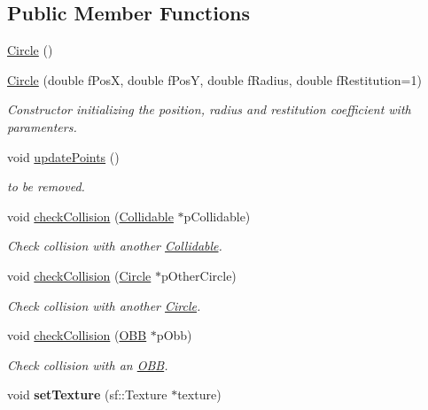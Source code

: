 \subsection*{Public Member Functions}
\begin{DoxyCompactItemize}
\item 
\hyperlink{class_circle_ad1ecfcfc7bf34529c6a6d6c448bf70fe}{Circle} ()
\item 
\hyperlink{class_circle_a70b2953314268546bc4f784c3e82df1b}{Circle} (double f\+Pos\+X, double f\+Pos\+Y, double f\+Radius, double f\+Restitution=1)
\begin{DoxyCompactList}\small\item\em Constructor initializing the position, radius and restitution coefficient with paramenters. \end{DoxyCompactList}\item 
\hypertarget{class_circle_afe23c30a1bbc5e831b72063aef91b38f}{}void \hyperlink{class_circle_afe23c30a1bbc5e831b72063aef91b38f}{update\+Points} ()\label{class_circle_afe23c30a1bbc5e831b72063aef91b38f}

\begin{DoxyCompactList}\small\item\em to be removed. \end{DoxyCompactList}\item 
void \hyperlink{class_circle_ad74b27696652e85e97503aef986f32b5}{check\+Collision} (\hyperlink{class_collidable}{Collidable} $\ast$p\+Collidable)
\begin{DoxyCompactList}\small\item\em Check collision with another \hyperlink{class_collidable}{Collidable}. \end{DoxyCompactList}\item 
void \hyperlink{class_circle_a7c54825cfff10ec9d6edb718431cd475}{check\+Collision} (\hyperlink{class_circle}{Circle} $\ast$p\+Other\+Circle)
\begin{DoxyCompactList}\small\item\em Check collision with another \hyperlink{class_circle}{Circle}. \end{DoxyCompactList}\item 
void \hyperlink{class_circle_ad033972b43e0e590a4c4e7ec45a392e1}{check\+Collision} (\hyperlink{class_o_b_b}{O\+B\+B} $\ast$p\+Obb)
\begin{DoxyCompactList}\small\item\em Check collision with an \hyperlink{class_o_b_b}{O\+B\+B}. \end{DoxyCompactList}\item 
\hypertarget{class_circle_ac6c48964ac829b4c1a15b313d9ae102a}{}void {\bfseries set\+Texture} (sf\+::\+Texture $\ast$texture)\label{class_circle_ac6c48964ac829b4c1a15b313d9ae102a}

\end{DoxyCompactItemize}
